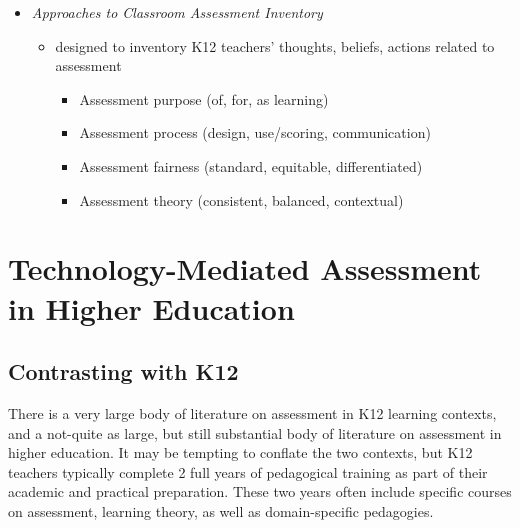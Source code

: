 \documentclass[
]{book}
\providecommand{\tightlist}{%
  \setlength{\itemsep}{0pt}\setlength{\parskip}{0pt}}
\begin{document}
\begin{itemize}
\tightlist
\item
  \emph{Approaches to Classroom Assessment Inventory}

  \begin{itemize}
  \tightlist
  \item
    designed to inventory K12 teachers' thoughts, beliefs, actions related to assessment

    \begin{itemize}
    \tightlist
    \item
      Assessment purpose (of, for, as learning)\\
    \item
      Assessment process (design, use/scoring, communication)\\
    \item
      Assessment fairness (standard, equitable, differentiated)\\
    \item
      Assessment theory (consistent, balanced, contextual)
    \end{itemize}
  \end{itemize}
\end{itemize}

\hypertarget{technology-mediated-assessment-in-higher-education}{%
\section*{Technology-Mediated Assessment in Higher Education}\label{technology-mediated-assessment-in-higher-education}}

\hypertarget{contrasting-with-k12}{%
\subsection*{Contrasting with K12}\label{contrasting-with-k12}}

There is a very large body of literature on assessment in K12 learning contexts, and a not-quite as large, but still substantial body of literature on assessment in higher education. It may be tempting to conflate the two contexts, but K12 teachers typically complete 2 full years of pedagogical training as part of their academic and practical preparation. These two years often include specific courses on assessment, learning theory, as well as domain-specific pedagogies.
\end{document}
